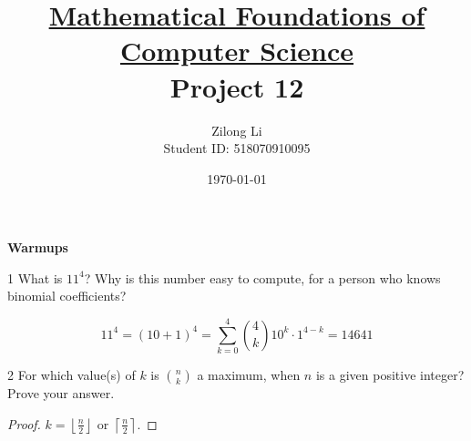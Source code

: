 \documentclass[a4paper,12pt]{article}
\title{\small \underline{Mathematical Foundations of Computer Science}\\\Large Project 12}
\author{Zilong Li\\\small Student ID: 518070910095}
\date{\today}
\makeatletter
\newtheorem*{solution}{Solution}
\theoremstyle{definition}
\renewenvironment{solution}[1][Solution] {\par\pushQED{\qed}\normalfont\topsep6\p@\@plus6\p@\relax\trivlist\item[\hskip\labelsep\bfseries#1\@addpunct{.}]\ignorespaces}{\popQED\endtrivlist\@endpefalse} \makeatother
\newenvironment{problems}{\begin{list}{}{\renewcommand{\makelabel}[1]{\textbf{##1}\hfil}}}{\end{list}}
\makeatother
\begin{document}
\maketitle

\noindent\textbf{Warmups}

\begin{problems}
    \item[1] What is $11^4$?  Why is this number easy to compute, for a person who knows binomial coefficients?
    \begin{solution}
        \begin{equation*}
            11^4 = (10+1)^4 = \sum_{k=0}^4 \binom{4}{k} 10^k\cdot 1^{4-k} = 14641
        \end{equation*}
    \end{solution} 
    \item[2]For which value(s) of $k$ is $\binom{n}{k}$ a maximum, when $n$ is a given positive integer?  Prove your answer.
    \begin{proof}
        $k=\left\lfloor \frac{n}{2}\right\rfloor$ or $\left\lceil \frac{n}{2}\right\rceil$.


\end{proof}
\end{problems}
\end{document}
